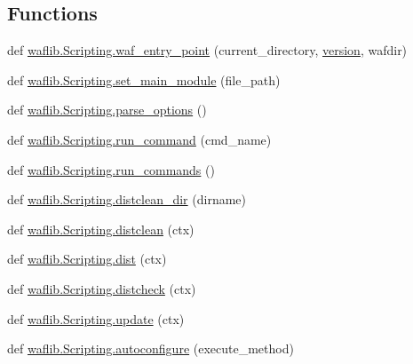 \subsection*{Functions}
\begin{DoxyCompactItemize}
\item 
def \hyperlink{namespacewaflib_1_1_scripting_af0475248068bf49514936da37a8ad06d}{waflib.\+Scripting.\+waf\+\_\+entry\+\_\+point} (current\+\_\+directory, \hyperlink{lib_2expat_8h_aec5db107b91447a96c47961ce9df2660}{version}, wafdir)
\item 
def \hyperlink{namespacewaflib_1_1_scripting_a0b661d623e41224ef81a1117c8e85013}{waflib.\+Scripting.\+set\+\_\+main\+\_\+module} (file\+\_\+path)
\item 
def \hyperlink{namespacewaflib_1_1_scripting_a2bda2ff8285115249d46f85770fd9c13}{waflib.\+Scripting.\+parse\+\_\+options} ()
\item 
def \hyperlink{namespacewaflib_1_1_scripting_a98e5b0d2647a1b2ed0079113115b31d5}{waflib.\+Scripting.\+run\+\_\+command} (cmd\+\_\+name)
\item 
def \hyperlink{namespacewaflib_1_1_scripting_a93d98863de24401f46121efa6efebb25}{waflib.\+Scripting.\+run\+\_\+commands} ()
\item 
def \hyperlink{namespacewaflib_1_1_scripting_a27e0c891ab55c641e07172796c3238ad}{waflib.\+Scripting.\+distclean\+\_\+dir} (dirname)
\item 
def \hyperlink{namespacewaflib_1_1_scripting_a5fc843a43fb95861d591abfaa7c70444}{waflib.\+Scripting.\+distclean} (ctx)
\item 
def \hyperlink{namespacewaflib_1_1_scripting_ade42ef48015fcded2eb15f341967ff47}{waflib.\+Scripting.\+dist} (ctx)
\item 
def \hyperlink{namespacewaflib_1_1_scripting_a65ff0b2233e65e673523cde5ff874633}{waflib.\+Scripting.\+distcheck} (ctx)
\item 
def \hyperlink{namespacewaflib_1_1_scripting_a001767ca97ff16ec1ad4bc5d8ce817eb}{waflib.\+Scripting.\+update} (ctx)
\item 
def \hyperlink{namespacewaflib_1_1_scripting_a3a2a1730248136d38a5c955e91296976}{waflib.\+Scripting.\+autoconfigure} (execute\+\_\+method)
\end{DoxyCompactItemize}
